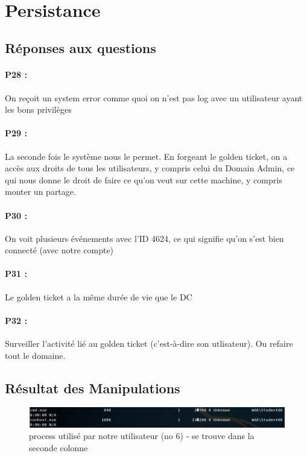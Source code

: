 \documentclass[12pt]{report} %
\begin{document}
\newpage
~
\newpage
~
\newpage
~
\newpage
\section*{Persistance}

\subsection*{Réponses aux questions}
\paragraph{P28 :} On reçoit un system error comme quoi on n'est pas log avec un utilisateur ayant les bons privilèges
\paragraph{P29 :} La seconde fois le système nous le permet. En forgeant le golden ticket, on a accès aux droits de tous les utilisateurs,
y compris celui du Domain Admin, ce qui nous donne le droit de faire ce qu'on veut sur cette machine, y compris monter un partage.
\paragraph{P30 :} On voit plusieurs événements avec l'ID 4624, ce qui signifie qu'on s'est bien connecté (avec notre compte)
\paragraph{P31 :} Le golden ticket a la même durée de vie que le DC
\paragraph{P32 :}  Surveiller l'activité lié au golden ticket (c'est-à-dire son utlisateur). Ou refaire tout le domaine.

\subsection*{Résultat des Manipulations}

\begin{figure}[!h]
	\includegraphics[width=17cm]{3_6_process_used_by_us.PNG}
	\caption*{process utilisé par notre utilisateur (no 6) - se trouve dans la seconde colonne}
\end{figure}
\end{document}
